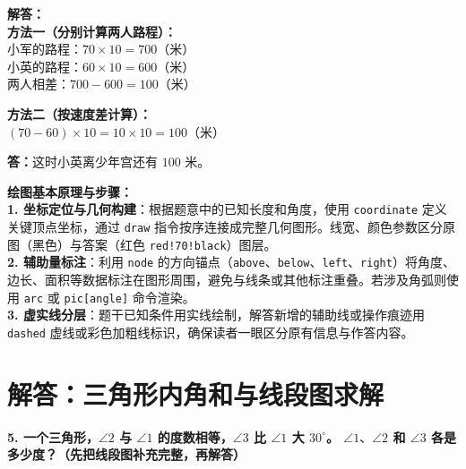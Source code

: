 \vspace{0.6cm}

\noindent
\textbf{解答：}\\
\textbf{方法一（分别计算两人路程）：}\\
小军的路程：$70 \times 10 = 700$（米）\\
小英的路程：$60 \times 10 = 600$（米）\\
两人相差：$700 - 600 = 100$（米）

\vspace{0.3cm}

\noindent
\textbf{方法二（按速度差计算）：}\\
$(70 - 60) \times 10 = 10 \times 10 = 100$（米）

\vspace{0.4cm}

\noindent
\textbf{答：}这时小英离少年宫还有 $100$ 米。

\vspace{0.8cm}


\vspace{0.6cm}

{\small\color{blue!70!black}
\textbf{绘图基本原理与步骤：}\\
\textbf{1. 坐标定位与几何构建}：根据题意中的已知长度和角度，使用 \texttt{coordinate} 定义关键顶点坐标，通过 \texttt{draw} 指令按序连接成完整几何图形。线宽、颜色参数区分原图（黑色）与答案（红色 \texttt{red!70!black}）图层。\\
\textbf{2. 辅助量标注}：利用 \texttt{node} 的方向锚点（\texttt{above}、\texttt{below}、\texttt{left}、\texttt{right}）将角度、边长、面积等数据标注在图形周围，避免与线条或其他标注重叠。若涉及角弧则使用 \texttt{arc} 或 \texttt{pic[angle]} 命令渲染。\\
\textbf{3. 虚实线分层}：题干已知条件用实线绘制，解答新增的辅助线或操作痕迹用 \texttt{dashed} 虚线或彩色加粗线标识，确保读者一眼区分原有信息与作答内容。
}

\newpage



\section{解答：三角形内角和与线段图求解}

\vspace{0.4cm}

\noindent\textbf{5. 一个三角形，$\angle 2$ 与 $\angle 1$ 的度数相等，$\angle 3$ 比 $\angle 1$ 大 $30^\circ$。 $\angle 1、\angle 2$ 和 $\angle 3$ 各是多少度？（先把线段图补充完整，再解答）}

